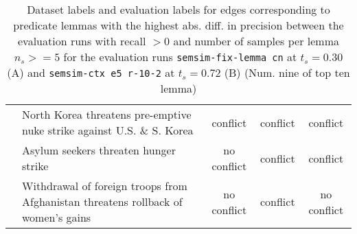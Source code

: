 \begin{sidewaystable}[ht]
\begin{tabular}{l p{13cm} ccc}
& North Korea threatens pre-emptive nuke strike against U.S. \& S. Korea & conflict & conflict & conflict \\
& Asylum seekers threaten hunger strike & no conflict & conflict & conflict \\
& Withdrawal of foreign troops from Afghanistan threatens rollback of women's gains & no conflict & conflict & no conflict \\
\bottomrule
\end{tabular}
\caption{Dataset labels and evaluation labels for edges corresponding to predicate lemmas with the highest abs. diff. in precision between the evaluation runs with recall \(> 0\) and number of samples per lemma \(n_s >= 5\) for the evaluation runs \texttt{semsim-fix-lemma cn} at \(t_s = 0.30\) (A) and \texttt{semsim-ctx e5 r-10-2} at \(t_s = 0.72\) (B)  (Num. nine of top ten lemma)}
\label{tab:ples-labels-5}
\end{sidewaystable}


